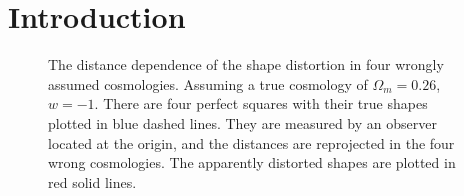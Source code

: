 \documentclass[iop]{emulateapj}
\begin{document}

\section{Introduction}

\begin{figure}
   \caption{\label{fig_xy}
   The distance dependence of the shape distortion in four wrongly assumed cosmologies.
   Assuming a true cosmology of $\Omega_m=0.26$, $w=-1$.
   There are four perfect squares with their true shapes plotted in blue dashed lines.
   They are measured by an observer located at the origin, and the distances are reprojected in the four wrong cosmologies.
   The apparently distorted shapes are plotted in red solid lines.
   }
\end{figure}
\end{document}
